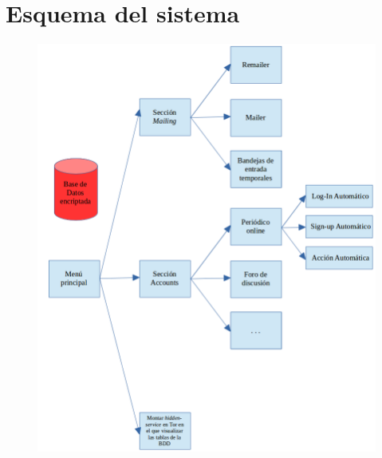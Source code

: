 \chapter{Esquema del sistema}
\label{Anexo:esquema}


\begin{figure}
	\centerline{
		\mbox{\includegraphics[width=7.00in]{images/esquema.png}}
	}
	\label{fig:esquema}
\end{figure}


\newpage \thispagestyle{empty} %